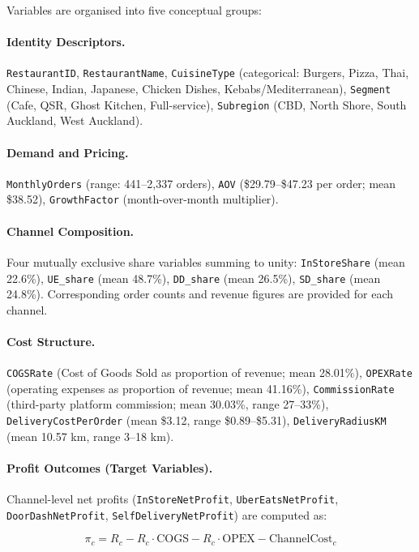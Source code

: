\documentclass[10pt,a4paper,twocolumn]{article}
\begin{document}
Variables are organised into five conceptual groups:

\paragraph{Identity Descriptors.}
\texttt{RestaurantID}, \texttt{RestaurantName}, \texttt{CuisineType} (categorical:
Burgers, Pizza, Thai, Chinese, Indian, Japanese, Chicken Dishes, Kebabs/Mediterranean),
\texttt{Segment} (Cafe, QSR, Ghost Kitchen, Full-service), \texttt{Subregion}
(CBD, North Shore, South Auckland, West Auckland).

\paragraph{Demand and Pricing.}
\texttt{MonthlyOrders} (range: 441--2{,}337 orders), \texttt{AOV} (\$29.79--\$47.23 per
order; mean \$38.52), \texttt{GrowthFactor} (month-over-month multiplier).

\paragraph{Channel Composition.}
Four mutually exclusive share variables summing to unity:
\texttt{InStoreShare} (mean 22.6\%), \texttt{UE\_share} (mean 48.7\%),
\texttt{DD\_share} (mean 26.5\%), \texttt{SD\_share} (mean 24.8\%).
Corresponding order counts and revenue figures are provided for each channel.

\paragraph{Cost Structure.}
\texttt{COGSRate} (Cost of Goods Sold as proportion of revenue; mean 28.01\%),
\texttt{OPEXRate} (operating expenses as proportion of revenue; mean 41.16\%),
\texttt{CommissionRate} (third-party platform commission; mean 30.03\%, range 27--33\%),
\texttt{DeliveryCostPerOrder} (mean \$3.12, range \$0.89--\$5.31),
\texttt{DeliveryRadiusKM} (mean 10.57 km, range 3--18 km).

\paragraph{Profit Outcomes (Target Variables).}
Channel-level net profits (\texttt{InStoreNetProfit}, \texttt{UberEatsNetProfit},
\texttt{DoorDashNetProfit}, \texttt{SelfDeliveryNetProfit}) are computed as:

\begin{equation}
  \pi_c = R_c - R_c \cdot \text{COGS} - R_c \cdot \text{OPEX} - \text{ChannelCost}_c
  \label{eq:channel_profit}
\end{equation}
\end{document}
